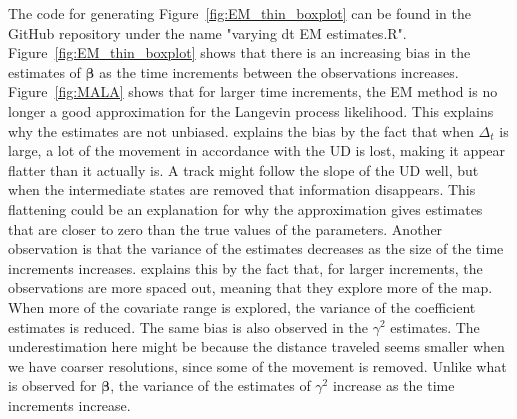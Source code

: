 The code for generating Figure~\ref{fig:EM_thin_boxplot} can be found in the GitHub repository under the name "varying dt EM estimates.R". Figure~\ref{fig:EM_thin_boxplot} shows that there is an increasing bias in the estimates of $\bm \beta$ as the time increments between the observations increases. Figure~\ref{fig:MALA} shows that for larger time increments, the EM method is no longer a good approximation for the Langevin process likelihood. This explains why the estimates are not unbiased. \parencite{michelot_langevin_2019} explains the bias by the fact that when $\Delta_t$ is large, a lot of the movement in accordance with the UD is lost, making it appear flatter than it actually is. A track might follow the slope of the UD well, but when the intermediate states are removed that information disappears. This flattening could be an explanation for why the approximation gives estimates that are closer to zero than the true values of the parameters. Another observation is that the variance of the estimates decreases as the size of the time increments increases. \parencite{michelot_langevin_2019} explains this by the fact that, for larger increments, the observations are more spaced out, meaning that they explore more of the map. When more of the covariate range is explored, the variance of the coefficient estimates is reduced. The same bias is also observed in the $\gamma^2$ estimates. The underestimation here might be because the distance traveled seems smaller when we have coarser resolutions, since some of the movement is removed. Unlike what is observed for $\bm \beta$, the variance of the estimates of $\gamma^2$ increase as the time increments increase.


